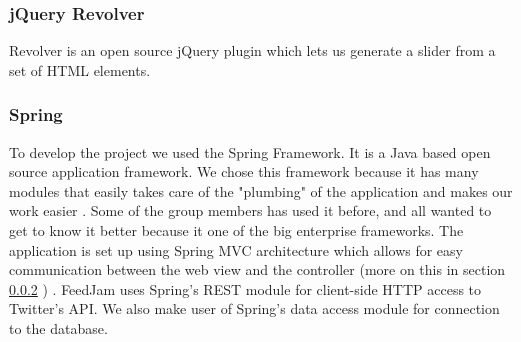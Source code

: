 \subsubsection{jQuery Revolver}
Revolver is an open source jQuery plugin which lets us generate a slider from a set of HTML elements.


\subsubsection{Spring} %
To develop the project we used the Spring Framework. It is a Java based open source application framework. We chose this framework because it has many modules that easily takes care of the "plumbing" of the application and makes our work easier \citep{SpringSourcec}. Some of the group members has used it before, and all wanted to get to know it better because it one of the big enterprise frameworks. The application is set up using Spring MVC architecture which allows for easy communication between the web view and the controller (more on this in section \ref{} \nameref{}) \citep{SpringSourcee}. FeedJam uses Spring's REST module for client-side HTTP access to Twitter's API. We also make user of Spring's data access module for connection to the database.